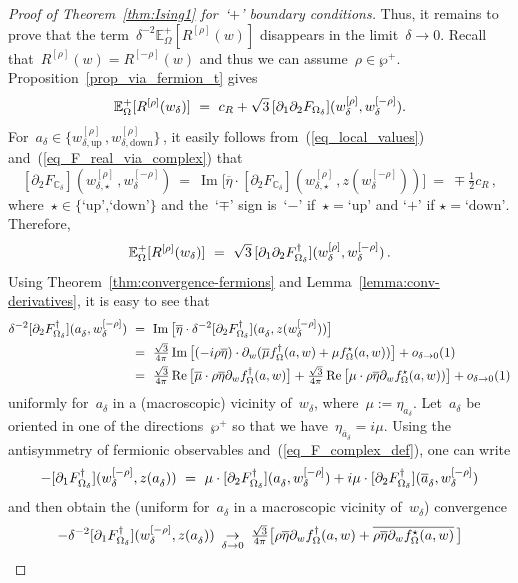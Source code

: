 \documentclass[reqno,11pt,a4paper]{amsart}
\theoremstyle{remark}
\newcommand{\C}{\mathbb{C}}
\newcommand{\CmR}{c_R}
\newcommand{\Rrho}{R^{[\rho]}}
\newcommand{\Rmrho}{R^{\left[-\rho \right]}}
\newcommand{\E}{\mathbb{E}_\Omega}
\newcommand{\wrho}{w^{\left[\rho \right]}}
\newcommand{\wmrho}{w^{\left[-\rho \right]}}
\newcommand{\fstar}{f_{\Omega}^\star}
\newcommand{\freg}{f_{\Omega}^\dag}
\newcommand{\dOne}{\partial_1}
\newcommand{\dTwo}{\partial_2}
\renewcommand\Re{\operatorname{Re}}
\renewcommand\Im{\operatorname{Im}}
\begin{document}
\begin{proof}[Proof of Theorem~\ref{thm:Ising1} for~`$+$' boundary conditions]
Thus, it remains to prove that the term~$\delta^{-2}\E^+[\Rrho(w)]$ disappears in the limit~$\delta\to 0$. Recall that~$\Rrho(w)=\Rmrho(w)$ and thus we can assume~$\rho\in\wp^+$. Proposition~\ref{prop_via_fermion_t} gives
\[
\E^+[\Rrho(w_\delta)] ~=~ \CmR+{\sqrt{3}}\,[\dOne\dTwo\Fdelta](\wrho_\delta,\wmrho_\delta).
\]
For~$a_\delta\in\{\wrho_{\delta,\mathrm{up}}\,,\wrho_{\delta,\mathrm{down}}\}$\,, it easily follows from~(\ref{eq_local_values}) and~(\ref{eq_F_real_via_complex}) that
\[
[\dTwo F_{\C_\delta}](\wrho_{\delta,\star}\,,\wmrho_\delta)~=~\Im\big[\overline{\eta}\cdot [\dTwo F_{\C_\delta}](\wrho_{\delta,\star}\,,z(\wmrho_\delta))\big]~=~\mp\tfrac{1}{2}\CmR\,,
\]
where~$\star\in\{\text{`up',`down'}\}$ and the~`$\mp$' sign is~`$-$' if~$\star=\text{`up'}$ and `$+$' if $\star=\text{`down'}$. Therefore,
\[
\E^+[\Rrho(w_\delta)] ~=~ \sqrt{3}\,[\dOne\dTwo\Fdelta^\dag](\wrho_\delta,\wmrho_\delta)\,.
\]
Using Theorem~\ref{thm:convergence-fermions} and Lemma~\ref{lemma:conv-derivatives}, it is easy to see that
\begin{align*}
\delta^{-2}[\dTwo\Fdelta^\dag](a_\delta^{\vphantom{\rho}},\wmrho_\delta)~&=~ \Im\big[\overline{\eta}\cdot\delta^{-2}[\dTwo\Fdelta^\dag](a_\delta^{\vphantom{\rho}},z(\wmrho_\delta))\big] \\ &=~%
 \tfrac{\sqrt{3}}{4\pi}\Im\big[(-i\rho\overline{\eta})\cdot \partial_w(\overline{\mu}\freg(a,w)+\mu \fstar(a,w))\big]+o_{\delta\to 0}(1)\\
 &=~\tfrac{\sqrt{3}}{4\pi}\Re\big[\overline{\mu}\cdot\rho\overline{\eta}\partial_w\freg(a,w)\big]+\tfrac{\sqrt{3}}{4\pi}\Re\big[\mu\cdot \rho\overline{\eta}\partial_w\fstar(a,w))\big]+o_{\delta\to 0}(1)
\end{align*}
uniformly for~$a_\delta$ in a (macroscopic) vicinity of~$w_\delta$, where~$\mu:=\eta_{a_\delta}$. Let~$a_\delta$ be oriented in one of the directions~$\wp^+$ so that we have~$\eta_{\overline{a}_\delta}=i\mu$. Using the antisymmetry of fermionic observables and~(\ref{eq_F_complex_def}), one can write
\[
-[\dOne\Fdelta^\dag](\wmrho_\delta,z(a_\delta^{\vphantom{\rho}}))~=~\mu\cdot [\dTwo\Fdelta^\dag](a_\delta^{\vphantom{\rho}},\wmrho_\delta)+ i\mu\cdot [\dTwo\Fdelta^\dag](\overline{a}_\delta^{\vphantom{\rho}},\wmrho_\delta)
\]
and then obtain the (uniform for~$a_\delta$ in a macroscopic vicinity of~$w_\delta$) convergence
\[
-\delta^{-2}[\dOne\Fdelta^\dag](\wmrho_\delta,z(a_\delta^{\vphantom{\rho}}))~\mathop{\to}_{\delta\to 0}~\tfrac{\sqrt{3}}{4\pi}\big[\rho\overline{\eta}\partial_w\freg(a,w)+\overline{\rho\overline{\eta}\partial_w\fstar(a,w)}\,\big]
\]
\end{proof}
\end{document}
